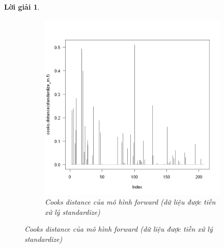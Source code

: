 \documentclass[14pt, a4paper]{article}
\theoremstyle{sltheorem}
\theoremstyle{soltheorem}
\newtheorem*{loigiai}{Lời giải}
\begin{document}
\begin{loigiai}
\begin{figure}[h!]
\begin{subfigure}[b]{0.4\textwidth}
            \includegraphics[width=\textwidth]{figures/standardize_mf_cooks.png}
            \caption{Cooks distance của mô hình forward (dữ liệu được tiền xử lý standardize)}
        \end{subfigure}
        \label{fig:Cooks-distance-mf}
    \end{figure}



\end{loigiai}
\end{document}
